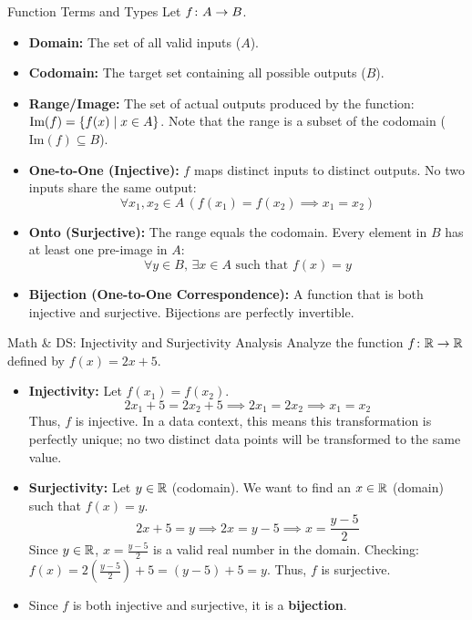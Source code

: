 \begin{definitionbox}{Function Terms and Types}
Let $f \colon A \to B$.
\begin{itemize}
    \item {}\textbf{Domain:} The set of all valid inputs ($A$).
    \item {}\textbf{Codomain:} The target set containing all possible outputs ($B$).
    \item {}\textbf{Range/Image:} The set of actual outputs produced by the function: $\text{Im}(f) = \left\{ f(x) \mid x \in A \right\}$. Note that the range is a subset of the codomain ($\text{Im}(f) \subseteq B$).
    \item {}\textbf{One-to-One (Injective):} $f$ maps distinct inputs to distinct outputs. No two inputs share the same output:
    $$\forall x_1, x_2 \in A \, (f(x_1) = f(x_2) \implies x_1 = x_2)$$
    \item {}\textbf{Onto (Surjective):} The range equals the codomain. Every element in $B$ has at least one pre-image in $A$:
    $$\forall y \in B, \, \exists x \in A \text{ such that } f(x) = y$$
    \item {}\textbf{Bijection (One-to-One Correspondence):} A function that is both injective and surjective. Bijections are perfectly invertible.
\end{itemize}
\end{definitionbox}

\begin{examplebox}{Math \& DS: Injectivity and Surjectivity Analysis}
Analyze the function $f \colon \mathbb{R} \to \mathbb{R}$ defined by $f(x) = 2x + 5$.
\begin{itemize}
    \item \textbf{Injectivity:} Let $f(x_1) = f(x_2)$.
    $$2x_1 + 5 = 2x_2 + 5 \implies 2x_1 = 2x_2 \implies x_1 = x_2$$
    Thus, $f$ is injective. In a data context, this means this transformation is perfectly unique; no two distinct data points will be transformed to the same value.
    \item \textbf{Surjectivity:} Let $y \in \mathbb{R}$ (codomain). We want to find an $x \in \mathbb{R}$ (domain) such that $f(x) = y$.
    $$2x + 5 = y \implies 2x = y - 5 \implies x = \frac{y-5}{2}$$
    Since $y \in \mathbb{R}$, $x = \frac{y-5}{2}$ is a valid real number in the domain.
    Checking: $f(x) = 2\left(\frac{y-5}{2}\right) + 5 = (y - 5) + 5 = y$.
    Thus, $f$ is surjective. 
    \item Since $f$ is both injective and surjective, it is a \textbf{bijection}.
\end{itemize}
\end{examplebox}

